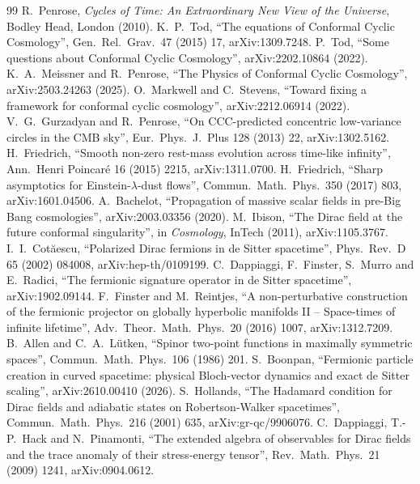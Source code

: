 \documentclass[11pt,a4paper]{article}
\theoremstyle{definition}
\begin{document}
\begin{thebibliography}{99}
 R.~Penrose, \emph{Cycles of Time: An Extraordinary New View of the Universe}, Bodley Head, London (2010).
 K.~P.~Tod, ``The equations of Conformal Cyclic Cosmology'', Gen.\ Rel.\ Grav.\ 47 (2015) 17, arXiv:1309.7248.
 P.~Tod, ``Some questions about Conformal Cyclic Cosmology'', arXiv:2202.10864 (2022).
 K.~A.~Meissner and R.~Penrose, ``The Physics of Conformal Cyclic Cosmology'', arXiv:2503.24263 (2025).
 O.~Markwell and C.~Stevens, ``Toward fixing a framework for conformal cyclic cosmology'', arXiv:2212.06914 (2022).
 V.~G.~Gurzadyan and R.~Penrose, ``On CCC-predicted concentric low-variance circles in the CMB sky'', Eur.\ Phys.\ J.\ Plus 128 (2013) 22, arXiv:1302.5162.
 H.~Friedrich, ``Smooth non-zero rest-mass evolution across time-like infinity'', Ann.\ Henri Poincar\'e 16 (2015) 2215, arXiv:1311.0700.
 H.~Friedrich, ``Sharp asymptotics for Einstein-$\lambda$-dust flows'', Commun.\ Math.\ Phys.\ 350 (2017) 803, arXiv:1601.04506.
 A.~Bachelot, ``Propagation of massive scalar fields in pre-Big Bang cosmologies'', arXiv:2003.03356 (2020).
 M.~Ibison, ``The Dirac field at the future conformal singularity'', in \emph{Cosmology}, InTech (2011), arXiv:1105.3767.
 I.~I.~Cot\u{a}escu, ``Polarized Dirac fermions in de Sitter spacetime'', Phys.\ Rev.\ D 65 (2002) 084008, arXiv:hep-th/0109199.
 C.~Dappiaggi, F.~Finster, S.~Murro and E.~Radici, ``The fermionic signature operator in de Sitter spacetime'', arXiv:1902.09144.
 F.~Finster and M.~Reintjes, ``A non-perturbative construction of the fermionic projector on globally hyperbolic manifolds II -- Space-times of infinite lifetime'', Adv.\ Theor.\ Math.\ Phys.\ 20 (2016) 1007, arXiv:1312.7209.
 B.~Allen and C.~A.~L\"utken, ``Spinor two-point functions in maximally symmetric spaces'', Commun.\ Math.\ Phys.\ 106 (1986) 201.
 S.~Boonpan, ``Fermionic particle creation in curved spacetime: physical Bloch-vector dynamics and exact de Sitter scaling'', arXiv:2610.00410 (2026).
 S.~Hollands, ``The Hadamard condition for Dirac fields and adiabatic states on Robertson-Walker spacetimes'', Commun.\ Math.\ Phys.\ 216 (2001) 635, arXiv:gr-qc/9906076.
 C.~Dappiaggi, T.-P.~Hack and N.~Pinamonti, ``The extended algebra of observables for Dirac fields and the trace anomaly of their stress-energy tensor'', Rev.\ Math.\ Phys.\ 21 (2009) 1241, arXiv:0904.0612.

\end{thebibliography}
\end{document}
